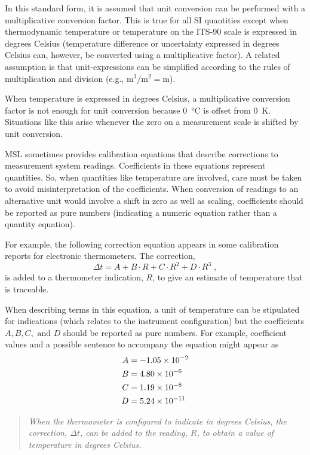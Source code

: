 In this standard form, it is assumed that unit conversion can be performed with a multiplicative conversion factor. This is true for all SI quantities except when thermodynamic temperature or temperature on the ITS-90 scale is expressed in degrees Celsius (temperature difference or uncertainty expressed in degrees Celsius can, however, be converted using a multiplicative factor). A related assumption is that unit-expressions can be simplified according to the rules of multiplication and division (e.g., $\si{\metre\cubed}/\si{\metre\squared}= \si{\metre}$). 

When temperature is expressed in degrees Celsius, a multiplicative conversion factor is not enough for unit conversion because \SI{0}{\celsius} is offset from \SI{0}{\kelvin}. 
Situations like this arise whenever the zero on a measurement scale is shifted by unit conversion.  


 
MSL sometimes provides calibration equations that describe corrections to measurement system readings. Coefficients in these equations represent quantities. So, when quantities like temperature are involved, care must be taken to avoid misinterpretation of the coefficients. When conversion of readings to an alternative unit would involve a shift in zero as well as scaling, coefficients should be reported as pure numbers (indicating a numeric equation rather than a quantity equation). 

For example, the following correction equation appears in some calibration reports for electronic thermometers. The correction,
\[
\Delta t = A + B \cdot R + C\cdot R^2 + D\cdot R^3\;,
\]
is added to a thermometer indication, $R$, to give an estimate of temperature that is traceable. 

When describing terms in this equation, a unit of temperature can be stipulated for indications (which relates to the instrument configuration) but the coefficients $A, B, C,\text{ and }D$ should be reported as pure numbers. For example, coefficient values and a possible sentence to accompany the equation might appear as
\begin{align*}
    A &= \num{-1.05e-2}\\
    B &= \num{+4.80e-6}\\
    C &= \num{+1.19E-8}\\
    D &= \num{+5.24e-11} 
\end{align*}
\begin{quote}
\textit{When the thermometer is configured to indicate in degrees Celsius, the correction, $\Delta t$, can be added to the reading, $R$, to obtain a value of temperature in degrees Celsius. }
\end{quote}

